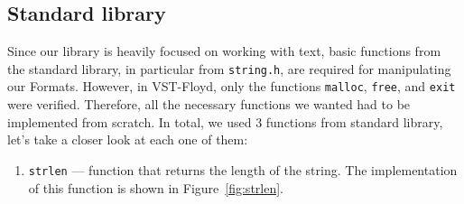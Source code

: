 \documentclass[14pt]{constructor-diploma}
\begin{document}
\subsection{Standard library}
Since our library is heavily focused on working with text, basic functions from the standard library, 
in particular from \texttt{string.h}, are required for manipulating our Formats. However, 
in VST-Floyd, only the functions \texttt{malloc}, \texttt{free}, and \texttt{exit} were verified. 
Therefore, all the necessary functions we wanted had to be implemented from scratch. In total, we used 3 functions 
from standard library, let's take a closer look at each one of them:

\begin{enumerate}
  \item \texttt{strlen} --- function that returns the length of the string. 
    The implementation of this function is shown in Figure~\ref{fig:strlen}.
      \begin{figure}[H]


\end{figure}
\end{enumerate}
\end{document}
